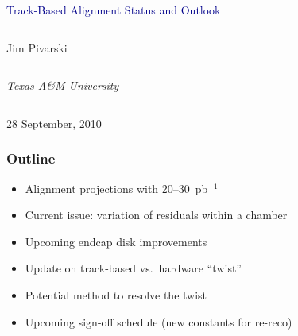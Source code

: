 \documentclass[compress]{beamer}
\begin{document}
\begin{frame}
\vfill
\begin{center}
\textcolor{darkblue}{\Large Track-Based Alignment Status and Outlook}

\vfill
\begin{columns}
\begin{center}
\large
Jim Pivarski
\end{center}
\end{columns}

\begin{columns}
\begin{center}
\scriptsize
{\it Texas A\&M University}
\end{center}
\end{columns}

\vfill
28 September, 2010

\end{center}
\end{frame}


\small

\begin{frame}
\frametitle{Outline}
\begin{itemize}\setlength{\itemsep}{0.5 cm}
\item Alignment projections with 20--30~pb$^{-1}$
\item Current issue: variation of residuals within a chamber
\item Upcoming endcap disk improvements
\item Update on track-based vs.\ hardware ``twist''
\item Potential method to resolve the twist
\item Upcoming sign-off schedule (new constants for re-reco)
\end{itemize}
\end{frame}
\end{document}
